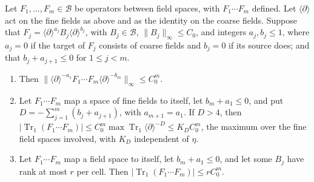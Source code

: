 \begin{lemma}\label{lem:ol-power-counting}
Let $F_1,\dots,F_m\in\mathscr B$ be operators between field spaces, with $F_1\cdots F_m$ defined. Let $\langle\partial\rangle$ act on the fine fields as above and as the identity on the coarse fields. Suppose that $F_j=\langle\partial\rangle^{a_j}B_j\langle\partial\rangle^{b_j}$, with $B_j\in\mathscr B$, $\|B_j\|_\infty\le C_0$, and integers $a_j,b_j\le1$, where $a_j=0$ if the target of $F_j$ consists of coarse fields and $b_j=0$ if its source does; and that $b_j+a_{j+1}\le0$ for $1\le j<m$.
\begin{enumerate}[label=(\alph*)]
\item Then $\|\langle\partial\rangle^{-a_1}F_1\cdots F_m\langle\partial\rangle^{-b_m}\|_\infty\le C_0^m$.
\item Let $F_1\cdots F_m$ map a space of fine fields to itself, let $b_m+a_1\le0$, and put $D=-\sum_{j=1}^m(b_j+a_{j+1})$, with $a_{m+1}=a_1$. If $D>4$, then $|\operatorname{Tr}_1(F_1\cdots F_m)|\le C_0^m\max\operatorname{Tr}_1\langle\partial\rangle^{-D}\le K_DC_0^m$, the maximum over the fine field spaces involved, with $K_D$ independent of $\eta$.
\item Let $F_1\cdots F_m$ map a field space to itself, let $b_m+a_1\le0$, and let some $B_j$ have rank at most $r$ per cell. Then $|\operatorname{Tr}_1(F_1\cdots F_m)|\le rC_0^m$.
\end{enumerate}
\end{lemma}

